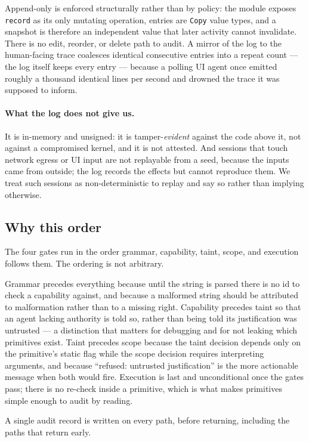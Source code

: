 \documentclass[11pt]{article}
\newcommand{\code}[1]{\texttt{#1}}
\begin{document}
Append-only is enforced structurally rather than by policy: the module exposes
\code{record} as its only mutating operation, entries are \code{Copy} value
types, and a snapshot is therefore an independent value that later activity
cannot invalidate. There is no edit, reorder, or delete path to audit. A
mirror of the log to the human-facing trace coalesces identical consecutive
entries into a repeat count --- the log itself keeps every entry --- because a
polling UI agent once emitted roughly a thousand identical lines per second and
drowned the trace it was supposed to inform.

\paragraph{What the log does not give us.} It is in-memory and unsigned: it is
tamper-\emph{evident} against the code above it, not against a compromised
kernel, and it is not attested. And sessions that touch network egress or UI
input are not replayable from a seed, because the inputs came from outside;
the log records the effects but cannot reproduce them. We treat such sessions
as non-deterministic to replay and say so rather than implying otherwise.

\subsection{Why this order}
\label{sec:order}

The four gates run in the order grammar, capability, taint, scope, and
execution follows them. The ordering is not arbitrary.

Grammar precedes everything because until the string is parsed there is no id
to check a capability against, and because a malformed string should be
attributed to malformation rather than to a missing right. Capability precedes
taint so that an agent lacking authority is told so, rather than being told its
justification was untrusted --- a distinction that matters for debugging and for
not leaking which primitives exist. Taint precedes scope because the taint
decision depends only on the primitive's static flag while the scope decision
requires interpreting arguments, and because ``refused: untrusted
justification'' is the more actionable message when both would fire. Execution
is last and unconditional once the gates pass; there is no re-check inside a
primitive, which is what makes primitives simple enough to audit by reading.

A single audit record is written on every path, before returning, including the
paths that return early.
\end{document}
